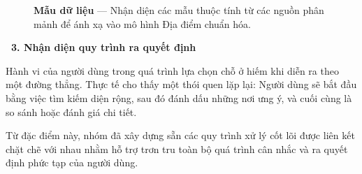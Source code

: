 \documentclass[12pt, a4paper]{article}
\begin{document}
\begin{figure}[H]
    \centering
    \caption{\textbf{Mẫu dữ liệu} --- Nhận diện các mẫu thuộc tính từ các nguồn phân mảnh để ánh xạ vào mô hình Địa điểm chuẩn hóa.}
\end{figure}

\vspace{0.4cm}
\noindent\textcolor{orange!80!black}{\textbf{\faBalanceScale \ 3. Nhận diện quy trình ra quyết định}}
\vspace{0.15cm}

\begin{tcolorbox}[blanker, borderline west={3pt}{0pt}{orange!70!black}, left=12pt, top=2pt, bottom=2pt]
Hành vi của người dùng trong quá trình lựa chọn chỗ ở hiếm khi diễn ra theo một đường thẳng. Thực tế cho thấy một thói quen lặp lại: Người dùng sẽ bắt đầu bằng việc tìm kiếm diện rộng, sau đó đánh dấu những nơi ưng ý, và cuối cùng là so sánh hoặc đánh giá chi tiết.

\vspace{0.15cm}
\noindent Từ đặc điểm này, nhóm đã xây dựng sẵn các quy trình xử lý cốt lõi được liên kết chặt chẽ với nhau nhằm hỗ trợ trơn tru toàn bộ quá trình cân nhắc và ra quyết định phức tạp của người dùng.
\end{tcolorbox}
\end{document}

